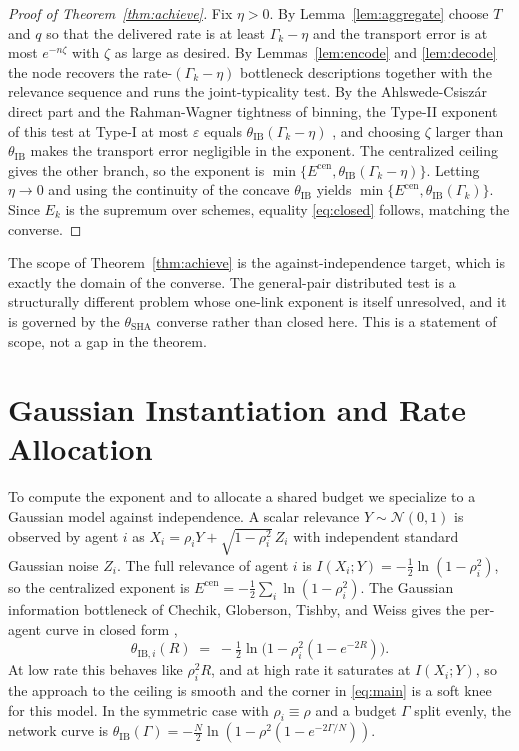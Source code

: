 \documentclass[journal]{IEEEtran}
\theoremstyle{definition}
\theoremstyle{remark}
\newcommand{\Ecen}{E^{\mathrm{cen}}}
\newcommand{\tib}{\theta_{\mathrm{IB}}}
\newcommand{\tibi}{\theta_{\mathrm{IB},i}}
\newcommand{\tsha}{\theta_{\mathrm{SHA}}}
\newcommand{\Gk}{\Gamma_k}
\begin{document}
\begin{proof}[Proof of Theorem~\ref{thm:achieve}]
Fix $\eta>0$. By Lemma~\ref{lem:aggregate} choose $T$ and $q$ so that the delivered rate is at least $\Gk-\eta$
and the transport error is at most $e^{-n\zeta}$ with $\zeta$ as large as desired. By Lemmas~\ref{lem:encode} and
\ref{lem:decode} the node recovers the rate-$(\Gk-\eta)$ bottleneck descriptions together with the relevance
sequence and runs the joint-typicality test. By the Ahlswede-Csisz\'ar direct part and the Rahman-Wagner
tightness of binning, the Type-II exponent of this test at Type-I at most $\varepsilon$ equals $\tib(\Gk-\eta)$
\cite{ahlswedecsiszar1986,rahmanwagner2012}, and choosing $\zeta$ larger than $\tib$ makes the transport error
negligible in the exponent. The centralized ceiling gives the other branch, so the exponent is
$\min\{\Ecen,\tib(\Gk-\eta)\}$. Letting $\eta\to0$ and using the continuity of the concave $\tib$ yields
$\min\{\Ecen,\tib(\Gk)\}$. Since $E_k$ is the supremum over schemes, equality \eqref{eq:closed} follows, matching
the converse.
\end{proof}

The scope of Theorem~\ref{thm:achieve} is the against-independence target, which is exactly the domain of the
converse. The general-pair distributed test is a structurally different problem whose one-link exponent is itself
unresolved, and it is governed by the $\tsha$ converse rather than closed here. This is a statement of scope, not
a gap in the theorem.

\section{Gaussian Instantiation and Rate Allocation}\label{sec:gaussian}
To compute the exponent and to allocate a shared budget we specialize to a Gaussian model against independence.
A scalar relevance $Y\sim\mathcal N(0,1)$ is observed by agent $i$ as $X_i=\rho_i Y+\sqrt{1-\rho_i^2}\,Z_i$ with
independent standard Gaussian noise $Z_i$. The full relevance of agent $i$ is $I(X_i;Y)=-\tfrac12\ln(1-\rho_i^2)$,
so the centralized exponent is $\Ecen=-\tfrac12\sum_i\ln(1-\rho_i^2)$. The Gaussian information bottleneck of
Chechik, Globerson, Tishby, and Weiss gives the per-agent curve in closed form \cite{chechik2005},
\begin{equation}
\tibi(R)\;=\;-\tfrac12\ln\!\big(1-\rho_i^2(1-e^{-2R})\big).\label{eq:gib}
\end{equation}
At low rate this behaves like $\rho_i^2 R$, and at high rate it saturates at $I(X_i;Y)$, so the approach to the
ceiling is smooth and the corner in \eqref{eq:main} is a soft knee for this model. In the symmetric case with
$\rho_i\equiv\rho$ and a budget $\Gamma$ split evenly, the network curve is
$\tib(\Gamma)=-\tfrac{N}{2}\ln(1-\rho^2(1-e^{-2\Gamma/N}))$.
\end{document}
